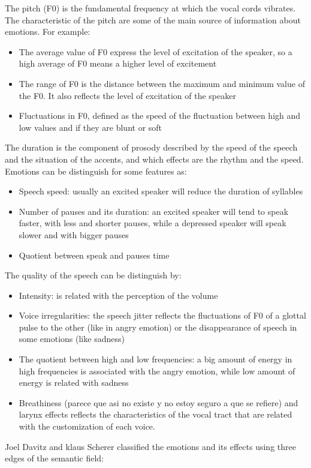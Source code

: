 The pitch (F0) is the fundamental frequency at which the vocal cords vibrates. The characteristic of the pitch are some of the main source of information about emotions. For example:
\begin{itemize}
 \item The average value of F0 express the level of excitation of the speaker, so a high average of F0 means a higher level of excitement
 \item The range of F0 is the distance between the maximum and minimum value of the F0. It also reflects the level of excitation of the speaker
 \item Fluctuations in F0, defined as the speed of the fluctuation between high and low values and if they are blunt or soft
\end{itemize}
The duration is the component of prosody described by the speed of the speech and the situation of the accents, and which effects are the rhythm and the speed. Emotions can be distinguish for some features as:
\begin{itemize}
	\item Speech speed: usually an excited speaker will reduce the duration of syllables
	\item Number of pauses and its duration: an excited speaker will tend to speak faster, with less and shorter pauses, while a depressed speaker will speak slower and with bigger pauses
	\item Quotient between speak and pauses time
\end{itemize}
The quality of the speech can be distinguish by:
\begin{itemize}
	\item Intensity: is related with the perception of the volume
	\item Voice irregularities: the speech jitter reflects the fluctuations of F0 of a glottal pulse to the other (like in angry emotion) or the disappearance of speech in some emotions (like sadness)
	\item The quotient between high and low frequencies: a big amount of energy in high frequencies is associated with the angry emotion, while low amount of energy is related with sadness
	\item Breathiness (parece que asi no existe y no estoy seguro a que se refiere) and larynx effects reflects the characteristics of the vocal tract that are related with the customization of each voice.
\end{itemize}
Joel Davitz and klaus Scherer classified the emotions and its effects using three edges of the semantic field:

